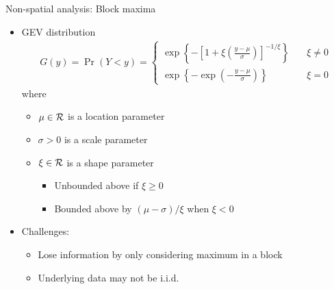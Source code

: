 \documentclass{beamer}
\begin{document}
\begin{frame}{Non-spatial analysis: Block maxima}
	\begin{itemize} \setlength{\itemsep}{1em}
		\item GEV distribution
		\begin{align*}
			G(y) = \Pr(Y < y) = \begin{cases}
			\exp\left\{ -\left[ 1 + \xi \left( \frac{ y - \mu }{ \sigma } \right) \right]^{ -1 / \xi} \right\} & \quad \xi \neq 0 \\[0.5em]
			\exp \left\{ -\exp \left( - \frac{ y - \mu }{ \sigma} \right) \right\} & \quad \xi = 0
			\end{cases}
		\end{align*}
		where
		\begin{itemize} \setlength{\itemsep}{0.25em}
			\item $\mu \in {\cal R}$ is a location parameter
			\item $\sigma > 0$ is a scale parameter
			\item $\xi \in {\cal R}$ is a shape parameter
			\begin{itemize}
				\item Unbounded above if $\xi \ge 0$
				\item Bounded above by $(\mu - \sigma) / \xi$ when $\xi < 0$
			\end{itemize}
		\end{itemize}
		\item Challenges:
		\begin{itemize}
			\item Lose information by only considering maximum in a block
			\item Underlying data may not be i.i.d.
		\end{itemize}
	\end{itemize}
\end{frame}
 
\end{document}
